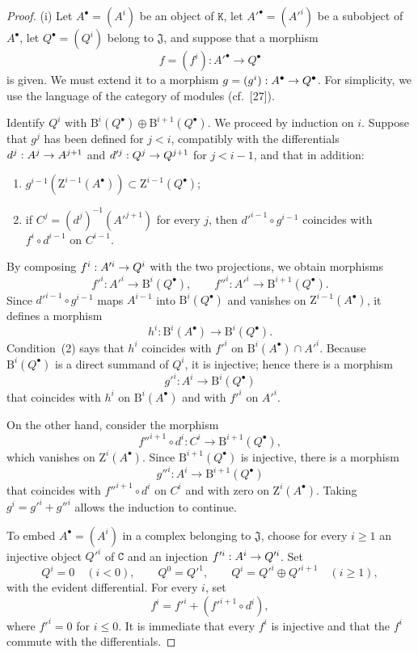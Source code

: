 \documentclass[oneside]{amsart}
\theoremstyle{ega-env-style}
\theoremstyle{ega-thm-env-style}
\theoremstyle{ega-defn-env-style}
\def\cat{\mathtt}                   %
\def\leq{\leqslant}                 %
\def\geq{\geqslant}                 %
\renewcommand{\to}{\mathchoice{\longrightarrow}{\rightarrow}{\rightarrow}{\rightarrow}}
\begin{document}
\begin{proof}
{\rm(i)}
Let $A^\bullet=(A^i)$ be an object of $\cat{K}$, let $A'^\bullet=(A'^i)$ be a subobject of $A^\bullet$, let $Q^\bullet=(Q^i)$ belong to $\mathfrak{J}$, and suppose that a morphism
\[
  f=(f^i):A'^\bullet\longrightarrow Q^\bullet
\]
is given.
We must extend it to a morphism $g=(g^i):A^\bullet\to Q^\bullet$.
For simplicity, we use the language of the category of modules (cf.~[27]).

Identify $Q^i$ with $\mathrm{B}^i(Q^\bullet)\oplus\mathrm{B}^{i+1}(Q^\bullet)$.
We proceed by induction on $i$.
Suppose that $g^j$ has been defined for $j<i$, compatibly with the differentials $d^j:A^j\to A^{j+1}$ and $d'^j:Q^j\to Q^{j+1}$ for $j<i-1$, and that in addition:
\begin{enumerate}
  \item[{\rm(1)}] $g^{i-1}(\mathrm{Z}^{i-1}(A^\bullet))\subset\mathrm{Z}^{i-1}(Q^\bullet)$;
  \item[{\rm(2)}] if $C^j=(d^j)^{-1}(A'^{j+1})$ for every $j$, then $d'^{i-1}\circ g^{i-1}$ coincides with $f^i\circ d^{i-1}$ on $C^{i-1}$.
\end{enumerate}
By composing $f^i:A'^i\to Q^i$ with the two projections, we obtain morphisms
\[
  f'^i:A'^i\longrightarrow\mathrm{B}^i(Q^\bullet),
  \qquad
  f''^i:A'^i\longrightarrow\mathrm{B}^{i+1}(Q^\bullet).
\]
Since $d'^{i-1}\circ g^{i-1}$ maps $A^{i-1}$ into $\mathrm{B}^i(Q^\bullet)$ and vanishes on $\mathrm{Z}^{i-1}(A^\bullet)$, it defines a morphism
\[
  h^i:\mathrm{B}^i(A^\bullet)\longrightarrow\mathrm{B}^i(Q^\bullet).
\]
Condition~{\rm(2)} says that $h^i$ coincides with $f'^i$ on $\mathrm{B}^i(A^\bullet)\cap A'^i$.
Because $\mathrm{B}^i(Q^\bullet)$ is a direct summand of $Q^i$, it is injective; hence there is a morphism
\[
  g'^i:A^i\longrightarrow\mathrm{B}^i(Q^\bullet)
\]
that coincides with $h^i$ on $\mathrm{B}^i(A^\bullet)$ and with $f'^i$ on $A'^i$.

On the other hand, consider the morphism
\[
  f''^{i+1}\circ d^i:C^i\longrightarrow\mathrm{B}^{i+1}(Q^\bullet),
\]
which vanishes on $\mathrm{Z}^i(A^\bullet)$.
Since $\mathrm{B}^{i+1}(Q^\bullet)$ is injective, there is a morphism
\[
  g''^i:A^i\longrightarrow\mathrm{B}^{i+1}(Q^\bullet)
\]
that coincides with $f''^{i+1}\circ d^i$ on $C^i$ and with zero on $\mathrm{Z}^i(A^\bullet)$.
Taking $g^i=g'^i+g''^i$ allows the induction to continue.

\smallskip
{}
To embed $A^\bullet=(A^i)$ in a complex belonging to $\mathfrak{J}$, choose for every $i\geq1$ an injective object $Q'^i$ of $\cat{C}$ and an injection $f'^i:A^i\to Q'^i$.
Set
\[
  Q^i=0\quad(i<0),\qquad Q^0=Q'^1,\qquad
  Q^i=Q'^i\oplus Q'^{i+1}\quad(i\geq1),
\]
with the evident differential.
For every $i$, set
\[
  f^i=f'^i+(f'^{i+1}\circ d^i),
\]
where $f'^i=0$ for $i\leq0$.
It is immediate that every $f^i$ is injective and that the $f^i$ commute with the differentials.
\end{proof}
\end{document}
